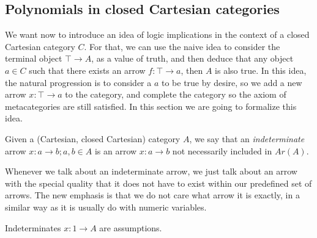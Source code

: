 \subsection{Polynomials in closed Cartesian categories}

We want now to introduce an idea of logic implications in the context of a closed Cartesian category $C$. For that, we can use the naive idea to consider the terminal object $\top \to A$, as a value of truth, and then deduce that any object $a\in C$ such that there exists an arrow $f:\top \to a$, then $A$ is also true. In this idea, the natural progression is to consider a $a$ to be true by desire, so we add a new arrow $x:\top \to a$ to the category, and complete the category so the axiom of metacategories are still satisfied. In this section we are going to formalize this idea.
\begin{definition}
  Given a (Cartesian, closed Cartesian) category $A$, we say that an \emph{indeterminate} arrow $x: a \to b; a,b \in A$ is an arrow $x:a \to b$  not necessarily included in $Ar(A)$. 
\end{definition}
\begin{remark}\label{remark-indeterminates}
  Whenever we talk about an indeterminate arrow, we just talk about an arrow with the special quality that it does not have to exist within our predefined set of arrows. The new emphasis is that we do not care what arrow it is exactly, in a similar way as it is usually do with numeric variables. 
\end{remark}
\begin{remark}
  Indeterminates $x: 1\to A$ are assumptions.
\end{remark}

